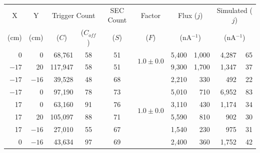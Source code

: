 \begin{table}
  \begin{center}
    \begin{tabular}{r | r | r | c | c | c | r@{~\(\pm\)~}r | r@{~\(\pm\)~}r}
      \multicolumn{1}{c|}{X}     &   \multicolumn{1}{c|}{Y}    &  \multicolumn{2}{c|}{Trigger Count}  &  \multicolumn{1}{c|}{SEC Count}  &  \multicolumn{1}{c|}{Factor}  &  \multicolumn{2}{c|}{Flux (\(j\))}  &  \multicolumn{2}{c}{Simulated (\(j\))}\\
      \multicolumn{1}{c|}{(cm)}  &  \multicolumn{1}{c|}{(cm)}  &         \multicolumn{1}{c|}{(\(C\))}  &  \multicolumn{1}{c|}{(\(C_{off}\))}         &  \multicolumn{1}{c|}{(\(S\))}    &   (\(F\))  &  \multicolumn{2}{c|}{(nA\(^{-1}\))}  &  \multicolumn{2}{c}{(nA\(^{-1}\))}   \\
      \hline
        0      &    0      &           68,761 & 58                &   51        &  \multirow{2}{*}{\(1.0\pm0.0\)}
                                                                                           &   5,400  &  1,000  &   4,287 & 65 \\
      \(-17\)  &   20      &          117,947 & 58                &   51        &          &   9,300  &  1,700  &   1,347 & 37 \\
      \hline
      \(-17\)  &  \(-16\)  &           39,528 & 48                &   68        & \multirow{8}{*}{\(1.0\pm0.0\)}  
                                                                                           &   2,210  &   330  &     492 &  22 \\
      \(-17\)  &    0      &           97,190 & 78                &   73        &          &   5,010  &   710  &   6,952 &  83 \\
       17      &    0      &           63,160 & 91                &   76        &          &   3,110  &   430  &   1,174 &  34 \\
       17      &   20      &          105,097 & 88                &   71        &          &   5,590  &   810  &     902 &  30 \\
       17      &  \(-16\)  &           27,010 & 55                &   67        &          &   1,540  &   230  &     975 &  31 \\
        0      &  \(-16\)  &           43,634 & 97                &   69        &          &   2,400  &   360  &   1,752 &  42 \\

\end{tabular}
\end{center}
\end{table}
